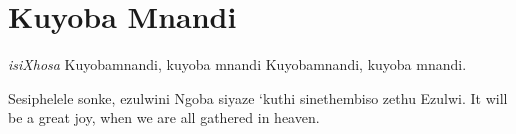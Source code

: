 \starttocol
\chapter{Kuyoba Mnandi}
\nexttocol
\hfill{\it isiXhosa}
\stoptocol
\starttocol
\startlines
K{\sc uyobamnandi}, kuyoba mnandi
Kuyobamnandi, kuyoba mnandi.

Sesiphelele sonke, ezulwini
Ngoba siyaze `kuthi sinethembiso zethu
Ezulwi.
\stoplines
\nexttocol
It will be a great joy, when we are all gathered in heaven.
\stoptocol
